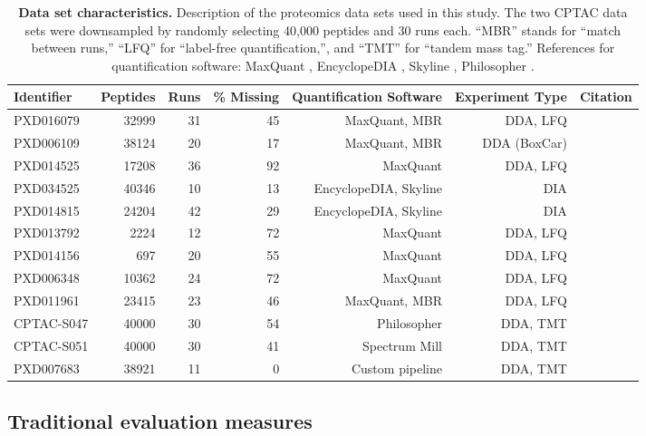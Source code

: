 \documentclass{article}
\begin{document}
\begin{table}
  \centering
  \begin{tabular}{lrrrrrr}
    \hline
    Identifier & Peptides & Runs & \% Missing & Quantification Software & Experiment Type & Citation \\
    \hline
    PXD016079 & 32999 & 31 & 45 & MaxQuant, MBR & DDA, LFQ & \cite{pxd016079} \\
    PXD006109 & 38124 & 20 & 17 & MaxQuant, MBR & DDA (BoxCar) & \cite{pxd006109} \\
    PXD014525 & 17208 & 36 & 92 & MaxQuant & DDA, LFQ & \cite{pxd014525} \\
    PXD034525 & 40346 & 10 & 13 & EncyclopeDIA, Skyline & DIA & \cite{smtg-maccoss} \\
    PXD014815 & 24204 & 42 & 29 & EncyclopeDIA, Skyline & DIA & \cite{matrix-matched-calib} \\
    PXD013792 & 2224 & 12 & 72 & MaxQuant & DDA, LFQ & \cite{pxd013792} \\
    PXD014156 & 697 & 20 & 55 & MaxQuant & DDA, LFQ & \cite{pxd014156} \\
    PXD006348 & 10362 & 24 & 72 & MaxQuant & DDA, LFQ & \cite{pxd006348} \\
    PXD011961 & 23415 & 23 & 46 & MaxQuant, MBR & DDA, LFQ & \cite{pxd011961} \\
    CPTAC-S047 & 40000 & 30 & 54 & Philosopher & DDA, TMT & \cite{CPTAC-S047} \\
    CPTAC-S051 & 40000 & 30 & 41 & Spectrum Mill & DDA, TMT & \cite{CPTAC-S051} \\
    PXD007683 & 38921 & 11 & 0 & Custom pipeline & DDA, TMT & \cite{pxd007683} \\
    \hline
  \end{tabular}
  \caption{{\bf Data set characteristics.} Description of the proteomics data sets used in this study. The two CPTAC data sets were downsampled by randomly selecting 40,000 peptides and 30 runs each. ``MBR'' stands for ``match between runs,'' ``LFQ'' for ``label-free quantification,'', and ``TMT'' for ``tandem mass tag.'' References for quantification software: MaxQuant \cite{MaxQuant}, EncyclopeDIA \cite{chromatogram-DIA}, Skyline \cite{skyline}, Philosopher \cite{philosopher}.}
    \label{tab:data-description}
\end{table}

\subsection{Traditional evaluation measures}
\end{document}

